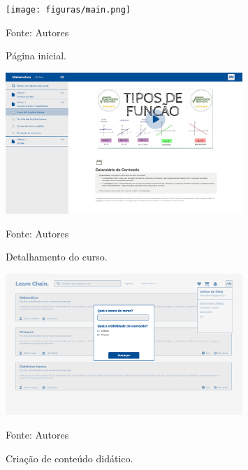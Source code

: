 \begin{apendicesenv}
    \begin{figure}[h]
        \centering
        \caption{Página inicial.}
        \texttt{[image: figuras/main.png]}
        \begin{center}
            {\footnotesize Fonte: Autores}
        \end{center}
        \label{fig:main}
    \end{figure}

    \begin{figure}[h]
        \centering
        \caption{Detalhamento do curso.}
        \includegraphics[width=0.8\textwidth]{figuras/detalhamento_do_curso.png}
        \begin{center}
            {\footnotesize Fonte: Autores}
        \end{center}
        \label{fig:detalhamento_do_curso}
    \end{figure}

    \begin{figure}[h]
        \centering
        \caption{Criação de conteúdo didático.}
        \includegraphics[width=0.8\textwidth]{figuras/Criar_conteudo_didatico.png}
        \begin{center}
            {\footnotesize Fonte: Autores}
        \end{center}
        \label{fig:Criar_conteudo_didatico}
    \end{figure}


\end{apendicesenv}
